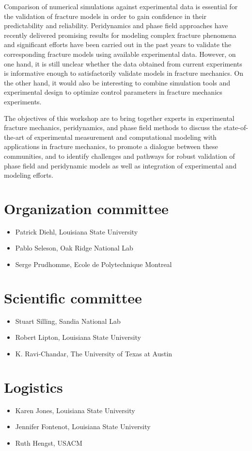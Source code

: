 Comparison of numerical simulations against experimental data is essential
for the validation of fracture models in order to gain confidence in their
predictability and reliability. Peridynamics and phase field approaches have recently
delivered promising results for modeling complex fracture phenomena and significant
efforts have been carried out in the past years to validate the corresponding
fracture models using available experimental data. However, on one hand, it is still
unclear whether the data obtained from current experiments is informative enough to
satisfactorily validate models in fracture mechanics. On the other hand, it would also be
interesting to combine simulation tools and experimental design to optimize
control parameters in fracture mechanics experiments.

The objectives of this workshop are to bring together experts in experimental fracture mechanics,
peridynamics, and phase field methods to discuss the state-of-the-art of experimental
measurement and computational modeling with applications in fracture mechanics, to promote
a dialogue between these communities, and to identify challenges and pathways for robust validation
of phase field and peridynamic models as well as integration of experimental and modeling efforts.

\section*{Organization committee }
\begin{itemize}
\item Patrick Diehl, Louisiana State University
\item Pablo Seleson, Oak Ridge National Lab
\item Serge Prudhomme, Ecole de Polytechnique Montreal
\end{itemize}

\section*{Scientific committee}
\begin{itemize}
\item Stuart Silling, Sandia National Lab
\item Robert Lipton, Louisiana State University
\item K. Ravi-Chandar, The University of Texas at Austin
\end{itemize}

\section*{Logistics}
\begin{itemize}
\item Karen Jones, Louisiana State University
\item Jennifer Fontenot, Louisiana State University
\item Ruth Hengst, USACM
\end{itemize}

